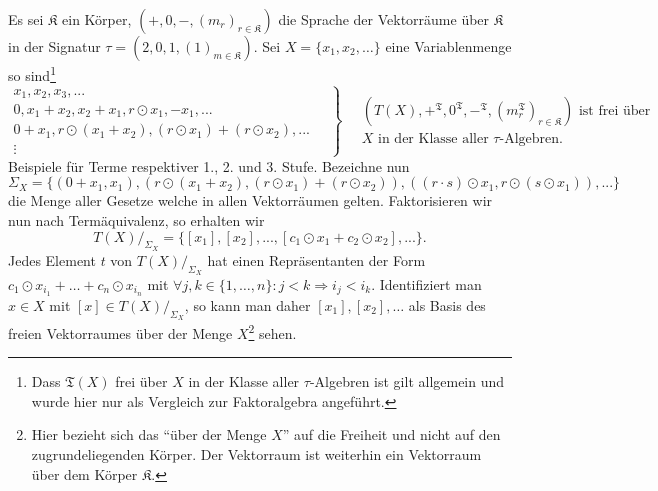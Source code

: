 \begin{example}
    Es sei $\mathfrak{K}$ ein Körper, $(+,0,-,(m_r)_{r\in\mathfrak{K}})$ die Sprache der Vektorräume über $\mathfrak{K}$ in der Signatur $\tau=(2,0,1,(1)_{m\in\mathfrak{K}})$. Sei
    $X=\{x_1,x_2,\ldots\}$ eine Variablenmenge so sind\footnote{Dass $\mathfrak{T}(X)$ frei über $X$ in der Klasse aller $\tau$-Algebren ist gilt allgemein und wurde hier nur als Vergleich zur Faktoralgebra angeführt.}
    $$ \left. \begin{matrix} x_1, x_2, x_3, ... \\ 0, x_1 + x_2, x_2 + x_1, r\odot x_1, -x_1, ... \\ 0 + x_1, r\odot (x_1+x_2), (r\odot x_1) + (r\odot x_2), ... \\ \vdots \end{matrix} \quad \right\} \quad \begin{matrix} (T(X), +^\mathfrak{T}, 0^\mathfrak{T}, -^\mathfrak{T},(m^\mathfrak{T}_r)_{r\in\mathfrak{K}}) \textrm{ ist frei über} \\ X \textrm{ in der Klasse aller $\tau$-Algebren.} \end{matrix} $$
    Beispiele für Terme respektiver 1., 2. und 3. Stufe. Bezeichne nun
    $$ \Sigma_X = \{ (0 + x_1, x_1), (r \odot (x_1+x_2), (r\odot x_1)+(r\odot x_2)), ((r\cdot s)\odot x_1, r\odot(s\odot x_1)), ... \} $$
    die Menge aller Gesetze welche in allen Vektorräumen gelten. Faktorisieren wir nun nach Term\-äquivalenz, so erhalten wir
    $$ T(X) /_{\Sigma_X} = \{ [x_1], [x_2], ..., [c_1\odot x_1 + c_2\odot x_2],... \}. $$
    Jedes Element $t$ von $T(X) /_{\Sigma_X}$ hat einen Repräsentanten der Form $c_1\odot x_{i_1}+\ldots +c_n\odot x_{i_n}$ mit $\forall j,k\in\{1,\ldots,n\}:j<k   \Rightarrow i_j<i_k$.
    Identifiziert man $x\in X$ mit $[x]\in T(X)/_{\Sigma_{X}}$, so kann man daher $[x_1],[x_2],\ldots$ als Basis des freien Vektorraumes über der Menge $X$\footnote{Hier bezieht sich das ``über der Menge $X$'' auf die Freiheit und nicht auf den zugrundeliegenden Körper. Der Vektorraum ist weiterhin ein Vektorraum über dem Körper $\mathfrak{K}$.} sehen.
\end{example}
